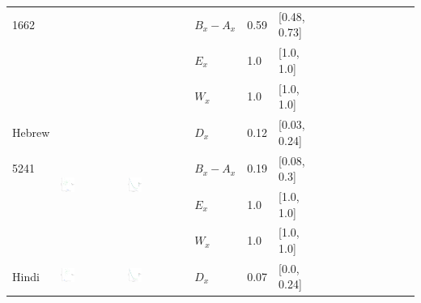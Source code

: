 \documentclass[11pt,letterpaper]{article}
\begin{document}
\begin{longtable}{lllllllllllllll}
1662  &    &    &  $B_x-A_x$  &  0.59  &  [0.48, 0.73]  \\ 
  &    &    &  $E_x$  &  1.0  &  [1.0, 1.0]  \\ 
  &    &    &  $W_x$  &  1.0  &  [1.0, 1.0]  \\ [10.25ex] \hline
Hebrew  &  \multirow{4}{*}{\includegraphics[width=0.25\textwidth]{figures/Hebrew-entropy-memory.pdf}}  &  \multirow{4}{*}{\includegraphics[width=0.25\textwidth]{figures/Hebrew-listener-surprisal-memory.pdf}}  &  $D_x$  &  0.12  &  [0.03, 0.24]  \\ 
5241  &    &    &  $B_x-A_x$  &  0.19  &  [0.08, 0.3]  \\ 
  &    &    &  $E_x$  &  1.0  &  [1.0, 1.0]  \\ 
  &    &    &  $W_x$  &  1.0  &  [1.0, 1.0]  \\ [10.25ex] \hline
Hindi  &  \multirow{4}{*}{\includegraphics[width=0.25\textwidth]{figures/Hindi-entropy-memory.pdf}}  &  \multirow{4}{*}{\includegraphics[width=0.25\textwidth]{figures/Hindi-listener-surprisal-memory.pdf}}  &  $D_x$  &  0.07  &  [0.0, 0.24]  \\ 

\end{longtable}
\end{document}
